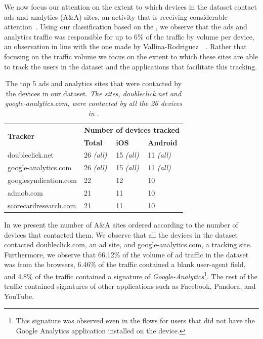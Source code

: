 We now focus our attention on the extent to which devices in the
\mobWild dataset contact ads and analytics (A\&A) sites, an activity
that is receiving considerable
attention~\cite{roesner:webtrackers,leontiadis:mobileads,vallina-rod:ads}.
Using our classification based on the \httphost, we observe that the
ads and analytics traffic was responsible for up to 6\% of the traffic
by volume per device, an observation in line with the one made by
Vallina-Rodriguez~\etal~\cite{vallina-rod:ads}.  Rather that focusing
on the traffic volume we focus on the extent to which these sites are
able to track the users in the dataset and the applications that
facilitate this tracking.

\begin{table}
\centering
\begin{small}
\begin{tabular}{|p{}|p{}|p{}|p{}|}
\hline
\multirow{2}{*}{\bf Tracker} & \multicolumn{3}{c|}{\bf Number of devices tracked}\tabularnewline
\cline{2-4}
                      &  {\bf Total} & {\bf iOS} & {\bf Android} \tabularnewline
\hline
doubleclick.net       & 26 {\em(all)} & 15 {\em(all)} & 11 {\em(all)} \tabularnewline
\hline
google-analytics.com  & 26 {\em(all)} & 15 {\em(all)}  & 11 {\em(all)} \tabularnewline
\hline
googlesyndication.com & 22 & 12 & 10 \tabularnewline
\hline
admob.com             & 21 & 11 & 10 \tabularnewline
\hline
scorecardresearch.com &  21 & 11 & 10 \tabularnewline
\hline
\end{tabular}
\end{small}
\caption{The top 5 ads and analytics sites that were contacted by the devices in our dataset.
\emph{The sites, doubleclick.net and google-analytics.com, were contacted by all the 26 devices in} \mobWild.}
\label{tab:top-trackers}
\end{table}

In  we present the number of A\&A sites ordered
according to the number of devices that contacted them.  We observe
that all the devices in the \mobWild dataset contacted
doubleclick.com, an ad site, and google-analytics.com, a tracking
site.  Furthermore, we observe that 66.12\% of the volume of ad
traffic in the \mobWild dataset was from the browsers, 6.46\% of the
traffic contained a blank user-agent field, and 4.8\% of the traffic
contained a signature of \emph{Google-Analytics}\footnote{This
  signature was observed even in the flows for users that did not have
  the Google Analytics application installed on the device.}.  The
rest of the traffic contained signatures of other applications such as
Facebook, Pandora, and YouTube.





